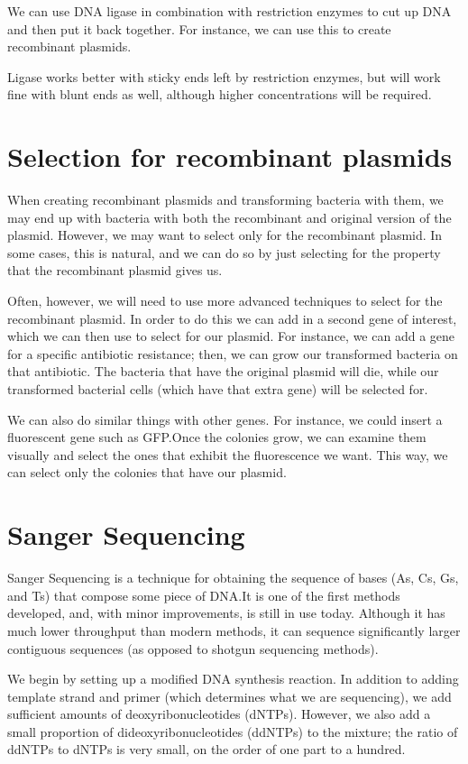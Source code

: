 \documentclass{article}
\begin{document}
We can use DNA ligase in combination with restriction enzymes to cut up DNA and then put it back
together. For instance, we can use this to create recombinant plasmids.

Ligase works better with sticky ends left by restriction enzymes, but will work fine with blunt ends
as well, although higher concentrations will be required.

\section*{Selection for recombinant plasmids}
When creating recombinant plasmids and transforming bacteria with them, we may end up with bacteria
with both the recombinant and original version of the plasmid. However, we may want to select only
for the recombinant plasmid. In some cases, this is natural, and we can do so by just selecting for
the property that the recombinant plasmid gives us.

Often, however, we will need to use more advanced techniques to select for the recombinant plasmid.
In order to do this we can add in a second gene of interest, which we can then use to select for our
plasmid. For instance, we can add a gene for a specific antibiotic resistance; then, we can grow our
transformed bacteria on that antibiotic. The bacteria that have the original plasmid will die, while
our transformed bacterial cells (which have that extra gene) will be selected for. 

We can also do similar things with other genes. For instance, we could insert a fluorescent gene
such as GFP.\@ Once the colonies grow, we can examine them visually and select the ones that exhibit 
the fluorescence we want. This way, we can select only the colonies that have our plasmid.

\section*{Sanger Sequencing}

Sanger Sequencing is a technique for obtaining the sequence of bases (As, Cs, Gs, and Ts) that
compose some piece of DNA.\@ It is one of the first methods developed, and, with minor improvements,
is still in use today. Although it has much lower throughput than modern methods, it can sequence
significantly larger contiguous sequences (as opposed to shotgun sequencing methods).

We begin by setting up a modified DNA synthesis reaction. In addition to adding template strand and
primer (which determines what we are sequencing), we add sufficient amounts of deoxyribonucleotides
(dNTPs). However, we also add a small proportion of dideoxyribonucleotides (ddNTPs) to the mixture;
the ratio of ddNTPs to dNTPs is very small, on the order of one part to a hundred.
\end{document}
